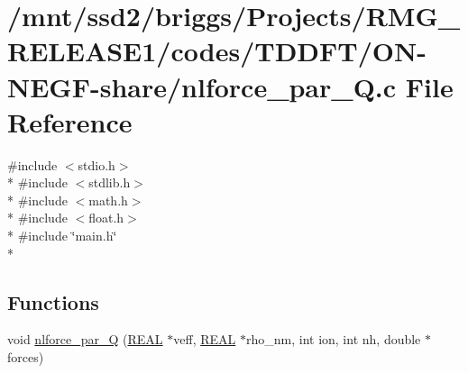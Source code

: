 \hypertarget{_t_d_d_f_t_2_o_n-_n_e_g_f-share_2nlforce__par___q_8c}{\section{/mnt/ssd2/briggs/\-Projects/\-R\-M\-G\-\_\-\-R\-E\-L\-E\-A\-S\-E1/codes/\-T\-D\-D\-F\-T/\-O\-N-\/\-N\-E\-G\-F-\/share/nlforce\-\_\-par\-\_\-\-Q.c File Reference}
\label{_t_d_d_f_t_2_o_n-_n_e_g_f-share_2nlforce__par___q_8c}
}
{\ttfamily \#include $<$stdio.\-h$>$}\\*
{\ttfamily \#include $<$stdlib.\-h$>$}\\*
{\ttfamily \#include $<$math.\-h$>$}\\*
{\ttfamily \#include $<$float.\-h$>$}\\*
{\ttfamily \#include \char`\"{}main.\-h\char`\"{}}\\*
\subsection*{Functions}
\begin{DoxyCompactItemize}
\item 
void \hyperlink{_t_d_d_f_t_2_o_n-_n_e_g_f-share_2nlforce__par___q_8c_a14d5f321a413060091d6ef8ac2a47e50}{nlforce\-\_\-par\-\_\-\-Q} (\hyperlink{md_8h_a4b654506f18b8bfd61ad2a29a7e38c25}{R\-E\-A\-L} $\ast$veff, \hyperlink{md_8h_a4b654506f18b8bfd61ad2a29a7e38c25}{R\-E\-A\-L} $\ast$rho\-\_\-nm, int ion, int nh, double $\ast$forces)
\end{DoxyCompactItemize}


